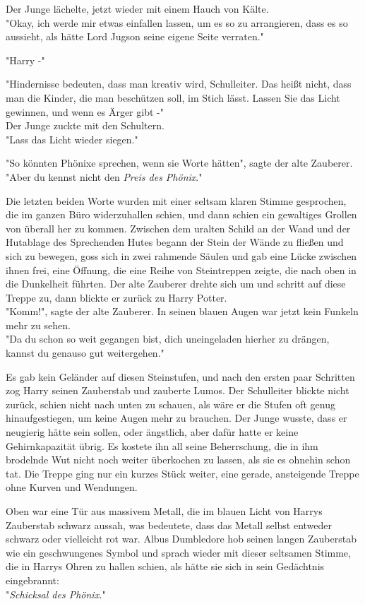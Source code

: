 {Der Junge lächelte, jetzt wieder mit einem Hauch von Kälte.\\ "Okay, ich werde mir etwas einfallen lassen, um es so zu arrangieren, dass es so aussieht, als hätte Lord Jugson seine eigene Seite verraten."

"Harry -"

"Hindernisse bedeuten, dass man kreativ wird, Schulleiter. Das heißt nicht, dass man die Kinder, die man beschützen soll, im Stich lässt. Lassen Sie das Licht gewinnen, und wenn es Ärger gibt -"\\ Der Junge zuckte mit den Schultern.\\ "Lass das Licht wieder siegen."

"So könnten Phönixe sprechen, wenn sie Worte hätten", sagte der alte Zauberer. "Aber du kennst nicht den \emph{Preis des Phönix}."

Die letzten beiden Worte wurden mit einer seltsam klaren Stimme gesprochen, die im ganzen Büro widerzuhallen schien, und dann schien ein gewaltiges Grollen von überall her zu kommen. Zwischen dem uralten Schild an der Wand und der Hutablage des Sprechenden Hutes begann der Stein der Wände zu fließen und sich zu bewegen, goss sich in zwei rahmende Säulen und gab eine Lücke zwischen ihnen frei, eine Öffnung, die eine Reihe von Steintreppen zeigte, die nach oben in die Dunkelheit führten. Der alte Zauberer drehte sich um und schritt auf diese Treppe zu, dann blickte er zurück zu Harry Potter.\\ "Komm!", sagte der alte Zauberer. In seinen blauen Augen war jetzt kein Funkeln mehr zu sehen.\\ "Da du schon so weit gegangen bist, dich uneingeladen hierher zu drängen, kannst du genauso gut weitergehen."

Es gab kein Geländer auf diesen Steinstufen, und nach den ersten paar Schritten zog Harry seinen Zauberstab und zauberte Lumos. Der Schulleiter blickte nicht zurück, schien nicht nach unten zu schauen, als wäre er die Stufen oft genug hinaufgestiegen, um keine Augen mehr zu brauchen. Der Junge wusste, dass er neugierig hätte sein sollen, oder ängstlich, aber dafür hatte er keine Gehirnkapazität übrig. Es kostete ihn all seine Beherrschung, die in ihm brodelnde Wut nicht noch weiter überkochen zu lassen, als sie es ohnehin schon tat. Die Treppe ging nur ein kurzes Stück weiter, eine gerade, ansteigende Treppe ohne Kurven und Wendungen.

Oben war eine Tür aus massivem Metall, die im blauen Licht von Harrys Zauberstab schwarz aussah, was bedeutete, dass das Metall selbst entweder schwarz oder vielleicht rot war. Albus Dumbledore hob seinen langen Zauberstab wie ein geschwungenes Symbol und sprach wieder mit dieser seltsamen Stimme, die in Harrys Ohren zu hallen schien, als hätte sie sich in sein Gedächtnis eingebrannt:\\ "\emph{Schicksal des Phönix.}"

}
